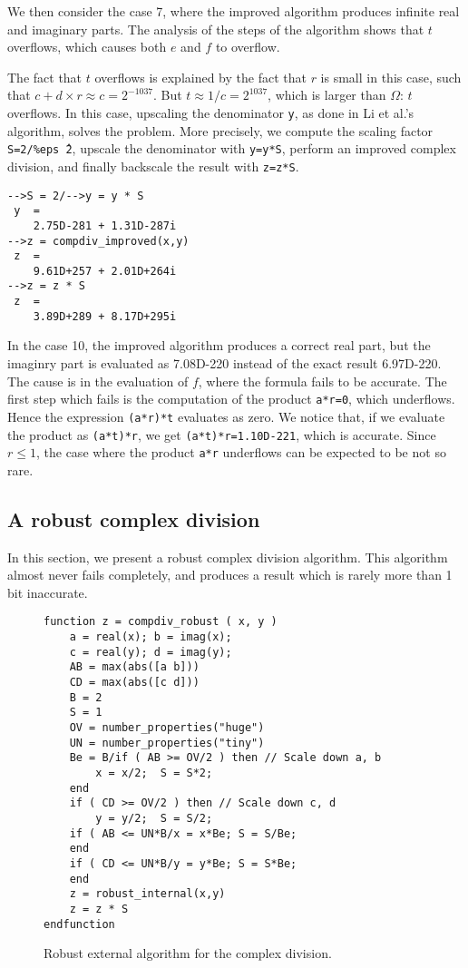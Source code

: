 \documentclass{paper}
\newcommand{\scivar}[1]{\texttt{#1}}
\begin{document}
We then consider the case 7, where the improved algorithm 
produces infinite real and imaginary parts.
The analysis of the steps of the algorithm shows that $t$ overflows, which causes 
both $e$ and $f$ to overflow. 

The fact that $t$ overflows is explained by the fact that 
$r$ is small in this case, such that $c + d \times r \approx c = 2^{-1037}$. 
But $t\approx 1/c=2^{1037}$, which is larger than $\Omega$: $t$ overflows. 
In this case, upscaling the denominator \scivar{y}, 
as done in Li et al.'s algorithm, solves the problem. 
More precisely, we compute the scaling factor \scivar{S=2/\%eps\^{\,}2}, 
upscale the denominator with \scivar{y=y*S}, 
perform an improved complex division, and finally backscale the 
result with \scivar{z=z*S}.
\lstset{language=scilabscript}
\begin{lstlisting}
-->S = 2/-->y = y * S
 y  =
    2.75D-281 + 1.31D-287i  
-->z = compdiv_improved(x,y)
 z  =
    9.61D+257 + 2.01D+264i  
-->z = z * S
 z  =
    3.89D+289 + 8.17D+295i  
\end{lstlisting}

In the case 10, the improved algorithm produces 
a correct real part, but the imaginry part is evaluated as 
7.08D-220 instead of the exact result 6.97D-220.
The cause is in the evaluation of $f$, where the formula 
fails to be accurate. 
The first step which fails is the computation of the product \scivar{a*r=0}, 
which underflows. 
Hence the expression \scivar{(a*r)*t} evaluates as zero. 
We notice that, if we evaluate the product as \scivar{(a*t)*r}, 
we get \scivar{(a*t)*r=1.10D-221}, which is accurate.
Since $r\leq 1$, the case where the product \scivar{a*r} underflows 
can be expected to be not so rare.


\subsection{A robust complex division}
In this section, we present a robust complex division 
algorithm. 
This algorithm almost never fails completely, and 
produces a result which is rarely more than 1 bit 
inaccurate. 

\begin{figure}
\caption{Robust external algorithm for the complex division.}
\label{fig-compdiv-algorobust}
\lstset{language=scilabscript}
\begin{lstlisting}
function z = compdiv_robust ( x, y )
    a = real(x); b = imag(x);
    c = real(y); d = imag(y);
    AB = max(abs([a b]))
    CD = max(abs([c d]))
    B = 2
    S = 1
    OV = number_properties("huge")
    UN = number_properties("tiny")
    Be = B/if ( AB >= OV/2 ) then // Scale down a, b
        x = x/2;  S = S*2;
    end
    if ( CD >= OV/2 ) then // Scale down c, d
        y = y/2;  S = S/2;
    if ( AB <= UN*B/x = x*Be; S = S/Be;
    end
    if ( CD <= UN*B/y = y*Be; S = S*Be;
    end
    z = robust_internal(x,y)
    z = z * S
endfunction
\end{lstlisting}
\end{figure}
\end{document}
